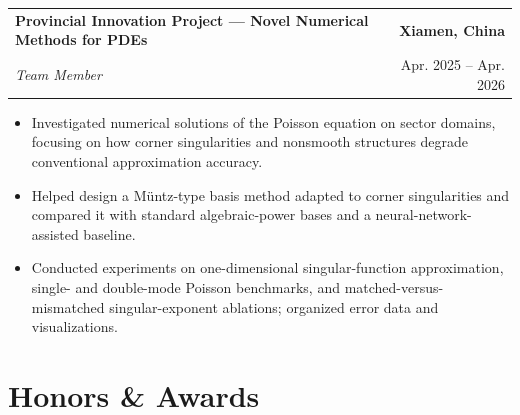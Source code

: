 \documentclass[letterpaper,10pt]{article}
\makeatletter
\newcommand{\resumeProject}[4]{
    \vspace{2pt}
    \noindent
    \begin{tabularx}{\textwidth}{@{}X@{\hspace{1em}}r@{}}
        \textbf{#1} & \textbf{#2} \\
        \textit{\textcolor{textgray}{#3}} & \textcolor{textgray}{#4} \\
    \end{tabularx}
    \vspace{-4pt}
}
\makeatother
\begin{document}
\resumeProject
{Provincial Innovation Project --- Novel Numerical Methods for PDEs}
{Xiamen, China}
{Team Member}
{Apr. 2025 -- Apr. 2026}
\begin{itemize}
  \item Investigated numerical solutions of the Poisson equation on sector domains, focusing on how corner singularities and nonsmooth structures degrade conventional approximation accuracy.
  \item Helped design a Müntz-type basis method adapted to corner singularities and compared it with standard algebraic-power bases and a neural-network-assisted baseline.
  \item Conducted experiments on one-dimensional singular-function approximation, single- and double-mode Poisson benchmarks, and matched-versus-mismatched singular-exponent ablations; organized error data and visualizations.
\end{itemize}

\section{Honors \& Awards}
\end{document}
